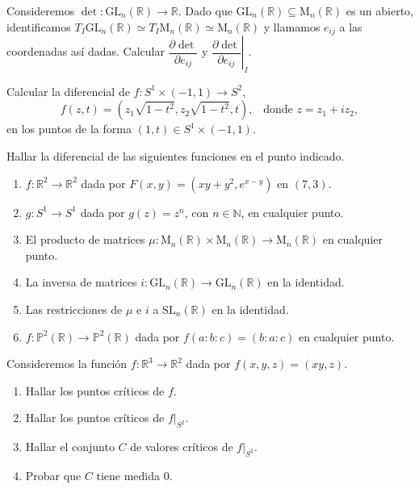 \documentclass[11pt]{article}
\newcommand{\R}{{\mathbb{R}}}
\newcommand{\N}{{\mathbb{N}}}
\numberwithin{theorem}{subsection}
\begin{document}
\begin{question}
	Consideremos $\det:\mathrm{GL}_n(\R)\to\R$. Dado que $\mathrm{GL}_n(\R)\subseteq\mathrm{M}_n(\R)$ es un abierto, identificamos $T_I\mathrm{GL}_n(\R)\simeq T_I\mathrm{M}_n(\R)\simeq\mathrm{M}_n(\R)$ y llamamos $e_{ij}$ a las coordenadas as\'i dadas. Calcular $\dfrac{\partial\det}{\partial e_{ij}}$ y $\left.\dfrac{\partial\det}{\partial e_{ij}}\right|_I$.
\end{question}

\begin{question}
	Calcular la diferencial de $f:S^1\times (-1,1)\to S^2$, $$f(z,t)=(z_1\sqrt{1-t^2},z_2\sqrt{1-t^2},t),\;\;\;\text{donde }z=z_1+iz_2,$$ en los puntos de la forma $(1,t)\in S^1\times (-1,1)$.
\end{question}

\begin{question}
	Hallar la diferencial de las siguientes funciones en el punto indicado.
	\begin{enumerate}
		\item $f:\R^2\to\R^2$ dada por $F(x,y)=(xy+y^2,e^{x-y})$ en $(7,3)$.
		\item $g:S^1\to S^1$ dada por $g(z)=z^n$, con $n\in\N$, en cualquier punto.
		\item El producto de matrices $\mu:\mathrm{M}_n(\R)\times\mathrm{M}_n(\R)\to\mathrm{M}_n(\R)$ en cualquier punto.
		\item La inversa de matrices $i:\mathrm{GL}_n(\R)\to\mathrm{GL}_n(\R)$ en la identidad.
		\item Las restricciones de $\mu$ e $i$ a $\mathrm{SL}_n(\R)$ en la identidad.
		\item $f:\mathbb{P}^2(\R)\to\mathbb{P}^2(\R)$ dada por $f(a:b:c)=(b:a:c)$ en cualquier punto.
	\end{enumerate}
\end{question}

\begin{question}
	Consideremos la funci\'on $f:\R^3\to\R^2$ dada por $f(x,y,z) = (xy,z)$.
	\begin{enumerate}
		\item Hallar los puntos cr\'iticos de $f$.
		\item Hallar los puntos cr\'iticos de $\left.f\right|_{S^2}$.
		\item Hallar el conjunto $C$ de valores cr\'iticos de $\left.f\right|_{S^2}$.
		\item Probar que $C$ tiene medida $0$.
	\end{enumerate}
\end{question}
\end{document}
